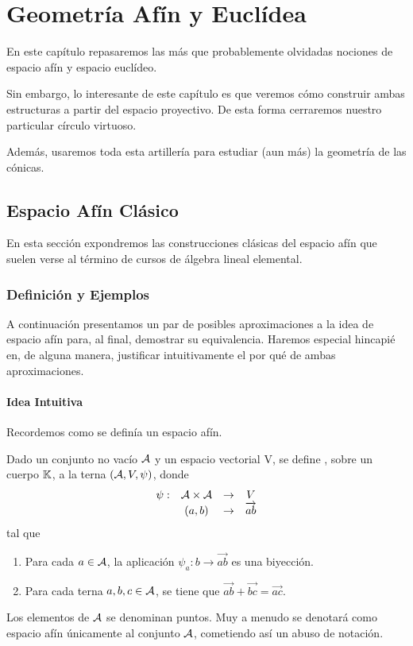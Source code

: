 \chapter{Geometría Afín y Euclídea}
\label{afin}
En este capítulo repasaremos las más que probablemente olvidadas nociones de espacio afín y espacio euclídeo.

Sin embargo, lo interesante de este capítulo es que veremos cómo construir ambas estructuras a partir del espacio proyectivo. De esta forma cerraremos nuestro particular círculo virtuoso.

Además, usaremos toda esta artillería para estudiar (aun más) la geometría de las cónicas.
\section{Espacio Afín Clásico}
\label{afinClas}
En esta sección expondremos las construcciones clásicas del espacio afín que suelen verse al término de cursos de álgebra lineal elemental.
\subsection{Definición y Ejemplos}
\label{afinClasDef}
A continuación presentamos un par de posibles aproximaciones a la idea de espacio afín para, al final, demostrar su equivalencia. Haremos especial hincapié en, de alguna manera, justificar intuitivamente el por qué de ambas aproximaciones.
\subsubsection{Idea Intuitiva}
\label{afinClasDefIdea}

Recordemos como se definía un espacio afín.
\begin{defi}\label{C9_def_espacio_afin}
	Dado un conjunto no vacío $\mathcal{A}$ y un espacio vectorial V, se define , sobre un cuerpo $\mathbb{K}$, a la terna $(\mathcal{A},V,\psi)$, donde
	\begin{equation*}
		\begin{array}{cccc}
			\psi: & \mathcal{A} \times \mathcal{A} & \rightarrow &V\\
			& (a,b) & \rightarrow & \overrightarrow{ab}
		\end{array}
	\end{equation*}
	tal que 
	\begin{enumerate}
		\item Para cada $a\in\mathcal{A}$, la aplicación $\psi_a: b\rightarrow \overrightarrow{ab}$ es una biyección.
		
		\item Para cada terna $a,b,c\in\mathcal{A}$, se tiene que $\overrightarrow{ab}+\overrightarrow{bc}=\overrightarrow{ac}$.
	\end{enumerate}
\end{defi}
Los elementos de $\mathcal{A}$ se denominan puntos. Muy a menudo se denotará como espacio afín únicamente al conjunto $\mathcal{A}$, cometiendo así un abuso de notación.

